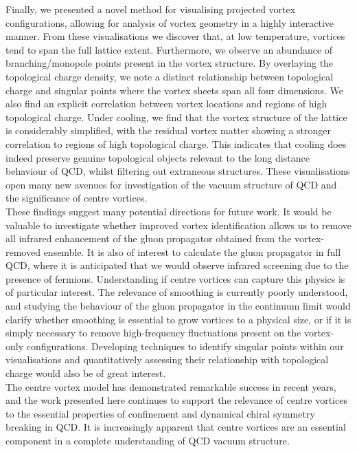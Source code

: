 Finally, we presented a novel method for visualising projected vortex configurations, allowing for analysis of vortex geometry in a highly interactive manner. From these visualisations we discover that, at low temperature, vortices tend to span the full lattice extent. Furthermore, we observe an abundance of branching/monopole points present in the vortex structure. By overlaying the topological charge density, we note a distinct relationship between topological charge and singular points where the vortex sheets span all four dimensions. We also find an explicit correlation between vortex locations and regions of high topological charge. Under cooling, we find that the vortex structure of the lattice is considerably simplified, with the residual vortex matter showing a stronger correlation to regions of high topological charge. This indicates that cooling does indeed preserve genuine topological objects relevant to the long distance behaviour of QCD, whilst filtering out extraneous structures. These visualisations open many new avenues for investigation of the vacuum structure of QCD and the significance of centre vortices.\\

These findings suggest many potential directions for future work. It would be valuable to investigate whether improved vortex identification allows us to remove all infrared enhancement of the gluon propagator obtained from the vortex-removed ensemble. It is also of interest to calculate the gluon propagator in full QCD, where it is anticipated that we would observe infrared screening due to the presence of fermions. Understanding if centre vortices can capture this physics is of particular interest. The relevance of smoothing is currently poorly understood, and studying the behaviour of the gluon propagator in the continuum limit would clarify whether smoothing is essential to grow vortices to a physical size, or if it is simply necessary to remove high-frequency fluctuations present on the vortex-only configurations. Developing techniques to identify singular points within our visualisations and quantitatively assessing their relationship with topological charge would also be of great interest.\\

The centre vortex model has demonstrated remarkable success in recent years, and the work presented here continues to support the relevance of centre vortices to the essential properties of confinement and dynamical chiral symmetry breaking in QCD. It is increasingly apparent that centre vortices are an essential component in a complete understanding of QCD vacuum structure.
